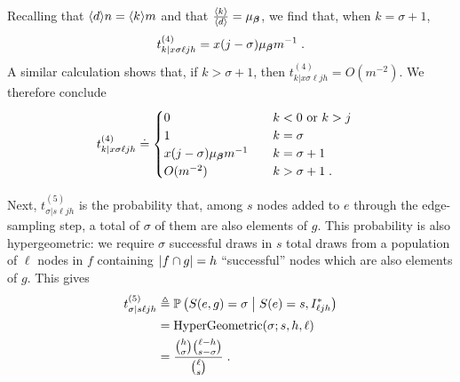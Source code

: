 Recalling that $\langle d \rangle n = \langle k \rangle{m}$ and that $\frac{\langle k \rangle}{\langle d \rangle} = \mu_{\boldsymbol{\beta}}$, we find that, when $k = \sigma+1$,  
\begin{align}
    t^{(4)}_{k|x\sigma\ell jh} = x(j-\sigma)\mu_{\boldsymbol{\beta}} m^{-1}\;.
\end{align}
A similar calculation shows that, if $k > \sigma+1$, then $t^{(4)}_{k|x\sigma\ell jh} = O(m^{-2})$.
We therefore conclude 
\begin{align}
    t^{(4)}_{k|x\sigma\ell jh}  &\doteq \begin{cases}
        0 &\quad k < 0 \text{ or } k > j\\ 
        1 &\quad k = \sigma \\ 
        x(j-\sigma)\mu_{\boldsymbol{\beta}} m^{-1} &\quad k = \sigma+1 \\ 
        O(m^{-2}) &\quad k > \sigma+1\;.
    \end{cases}
\end{align}

Next, $t^{(5)}_{\sigma|s\ell jh}$ is the probability that, among $s$ nodes added to $e$ through the edge-sampling step, a total of $\sigma$ of them are also elements of $g$.
This probability is also hypergeometric: we require $\sigma$ successful draws in $s$ total draws from a population of $\ell$ nodes in $f$ containing $\left\lvert f \cap g \right\rvert = h$ ``successful'' nodes which are also elements of $g$. 
This gives 
\begin{align}
    t^{(5)}_{\sigma|s\ell jh} &\eqdef \prob{S(e,g) = \sigma \given S(e) = s, I^*_{\ell j h}}  \\ 
    &= \mathrm{HyperGeometric}(\sigma; s, h, \ell)  \\ 
    &= \frac{\binom{h}{\sigma}\binom{\ell - h}{s - \sigma}}{\binom{\ell}{s}}\;. \label{eq:t5}
\end{align}


